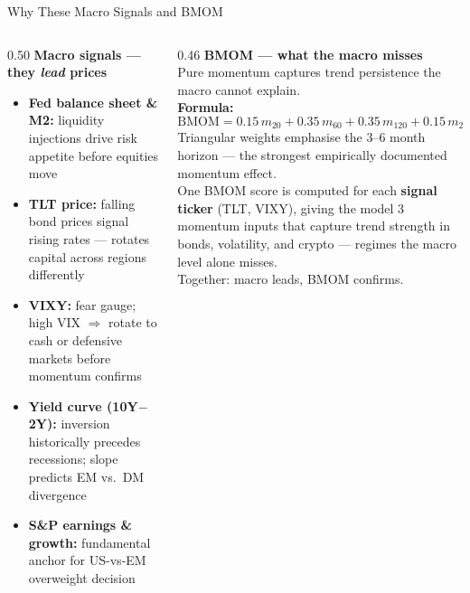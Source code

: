 \documentclass[aspectratio=169,11pt]{beamer}
\begin{document}

\begin{frame}{Why These Macro Signals and BMOM}
  \begin{columns}[T]
    \begin{column}{0.50\textwidth}
      \textbf{Macro signals --- they \emph{lead} prices}\\[0.4em]
      \begin{itemize}\small
        \setlength\itemsep{0.35em}
        \item \textbf{Fed balance sheet \& M2:} liquidity injections drive risk appetite before equities move
        \item \textbf{TLT price:} falling bond prices signal rising rates --- rotates capital across regions differently
        \item \textbf{VIXY:} fear gauge; high VIX $\Rightarrow$ rotate to cash or defensive markets before momentum confirms
        \item \textbf{Yield curve (10Y$-$2Y):} inversion historically precedes recessions; slope predicts EM vs.\ DM divergence
        \item \textbf{S\&P earnings \& growth:} fundamental anchor for US-vs-EM overweight decision
      \end{itemize}
    \end{column}
    \begin{column}{0.46\textwidth}
      \textbf{BMOM --- what the macro misses}\\[0.4em]
      \normalsize
      Pure momentum captures trend persistence the macro cannot explain.\\[0.5em]
      \small
      \textbf{Formula:}
      \[
        \text{BMOM} = 0.15\,m_{20} + 0.35\,m_{60} + 0.35\,m_{120} + 0.15\,m_{240}
      \]
      Triangular weights emphasise the 3--6 month horizon --- the strongest empirically documented momentum effect.\\[0.5em]
      One BMOM score is computed for each \textbf{signal ticker} (TLT, VIXY), giving the model 3 momentum inputs that capture trend strength in bonds, volatility, and crypto --- regimes the macro level alone misses.\\[0.5em]
      Together: macro leads, BMOM confirms.
    \end{column}
  \end{columns}
\end{frame}
\end{document}
